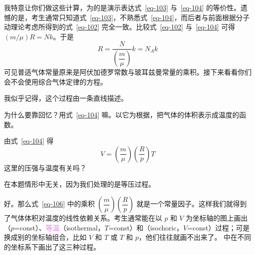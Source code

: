 \begin{dialogue}
\tchr 我特意让你们做这些计算，为的是演示表达式~\eqref{eq-103} 与~\eqref{eq-104} 的等价性。遗憾的是，考生通常只知道式~\eqref{eq-103}，不熟悉式~\eqref{eq-104}，而后者与前面根据分子动理论考虑所得到的式~\eqref{eq-102} 完全一致。比较式~\eqref{eq-102} 与~\eqref{eq-104} 可得 $( m/\mu)R=Nk$。于是
\begin{equation}%
R=\frac{N}{\left( \dfrac{m}{\mu} \right)} k =N_{A}k
\label{eq-105}
\end{equation}
可见普适气体常量原来是阿伏加德罗常数与玻耳兹曼常量的乘积。接下来看看你们会不会使用综合气体定律的方程。

\stda 我似乎记得，这个过程由一条直线描述。

\tchr 为什么要靠回忆？用式~\eqref{eq-104} 嘛。以它为根据，把气体的体积表示成温度的函数。

\stda 由式~\eqref{eq-104} 得
\begin{equation}%
V = \left( \dfrac{m}{\mu} \right) \left( \dfrac{R}{p} \right) T
\label{eq-106}
\end{equation}
\tchr 这里的压强与温度有关吗？

\stda 在本题情形中无关，因为我们处理的是等压过程。

\tchr 好。那么式~\eqref{eq-106} 中的乘积 $\left( \dfrac{m}{\mu} \right) \left( \dfrac{R}{p} \right)$ 就是一个常量因子。这样我们就得到了气体体积对温度的线性依赖关系。考生通常能在以 $p$ 和 $V$ 为坐标轴的图上画出（$p$=const）、\textcolor{violet}{等温}（isothermal，$T$=const）和（isochoric，$V$=const）过程；可是换成别的坐标轴组合，比如 $V$ 和 $T$ 或 $T$ 和 $p$，他们往往就画不出来了。 中在不同的坐标系下画出了这三种过程。
\begin{figure}
\centering
\end{figure}
\end{dialogue}
